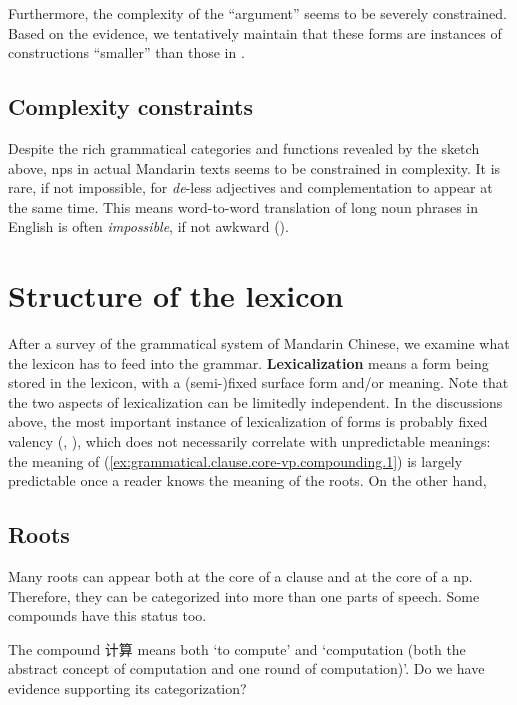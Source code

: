 \documentclass[UTF8, a4paper, oneside, scheme=plain, 12pt]{ctexrep}
\newcommand*{\concept}[1]{\textbf{#1}}
\newcommand{\form}[1]{\emph{#1}}
\newcommand{\translate}[1]{`#1'}
\begin{document}
Furthermore, the complexity of the ``argument'' seems to be severely constrained.
Based on the evidence, we tentatively maintain that these forms are instances
of constructions ``smaller'' than those in .

\subsection{Complexity constraints}\label{sec:grammatical.np.complexity}

Despite the rich grammatical categories and functions revealed by the sketch above,
\acp{np} in actual Mandarin texts seems to be constrained in complexity.
It is rare, if not impossible, for \form{de}-less adjectives and complementation to appear at the same time.
This means word-to-word translation of long noun phrases in English is often \emph{impossible},
if not awkward ().

\section{Structure of the lexicon}\label{sec:grammatical.lexicon}

After a survey of the grammatical system of Mandarin Chinese,
we examine what the lexicon has to feed into the grammar.
\concept{Lexicalization} means a form being stored in the lexicon,
with a (semi-)fixed surface form and/or meaning.
Note that the two aspects of lexicalization can be limitedly independent.
In the discussions above, the most important instance of lexicalization of forms
is probably fixed valency
(, ),
which does not necessarily correlate with unpredictable meanings:
the meaning of (\ref{ex:grammatical.clause.core-vp.compounding.1}) is largely predictable
once a reader knows the meaning of the roots.
On the other hand, 

\subsection{Roots}\label{sec:grammatical.lexicon.roots}

Many roots can appear both at the core of a clause and at the core of a \ac{np}.
Therefore, they can be categorized into more than one parts of speech.
Some compounds have this status too.

The compound 计算 means both \translate{to compute} and \translate{computation
(both the abstract concept of computation and one round of computation)}.
Do we have evidence supporting its categorization?
\end{document}
